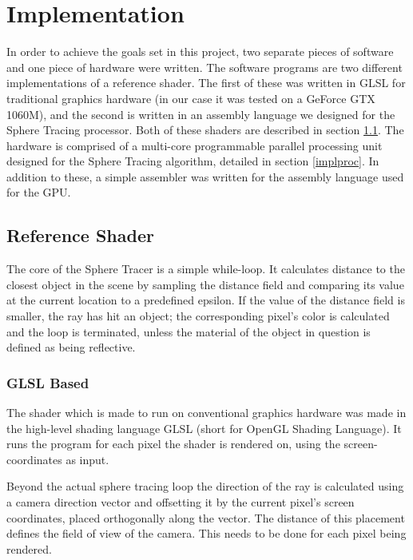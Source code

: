 \chapter{Implementation}

	In order to achieve the goals set in this project, two separate pieces of 
	software and one piece of hardware were written. The software programs are 
	two different implementations of a reference shader. The first of these was 
	written in GLSL for traditional graphics hardware (in our case it was 
	tested on a GeForce GTX 1060M), and the second is written in an assembly 
	language we designed for the Sphere Tracing processor. Both of these 
	shaders are described in section \ref{implshader}. The hardware is 
	comprised of a multi-core programmable parallel processing unit designed 
	for the Sphere Tracing algorithm, detailed in section \ref{implproc}. In 
	addition to these, a simple assembler was written for the assembly language
	used for the GPU.

	\section{Reference Shader} \label{implshader}

		The core of the Sphere Tracer is a simple while-loop. It calculates
		distance to the closest object in the scene by sampling the distance
		field and comparing its value at the current location to a predefined
		epsilon. If the value of the distance field is smaller, the ray has hit
		an object; the corresponding pixel's color is calculated and the loop
		is terminated, unless the material of the object in question is defined
		as being reflective.

		\subsection{GLSL Based}

			The shader which is made to run on conventional graphics hardware
			was made in the high-level shading language GLSL (short for OpenGL
			Shading Language). It runs the program for each pixel the shader is
			rendered on, using the screen-coordinates as input.

			Beyond the actual sphere tracing loop the direction of the ray is
			calculated using a camera direction vector and offsetting it by the
			current pixel's screen coordinates, placed orthogonally along the
			vector.  The distance of this placement defines the field of view
			of the camera. This needs to be done for each pixel being rendered.

